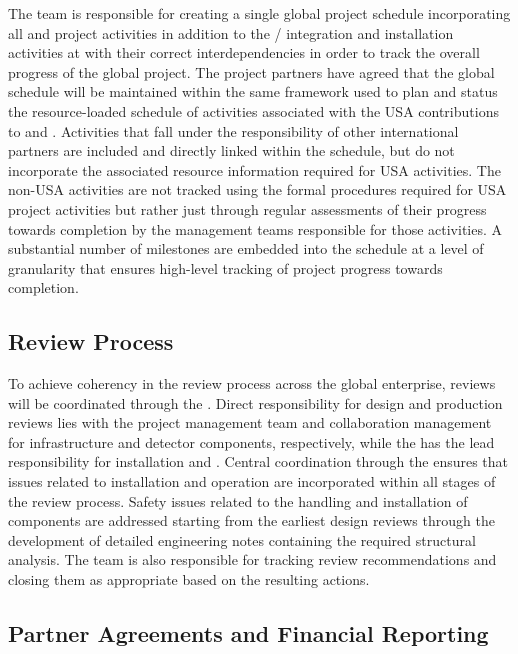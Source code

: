 The  team is responsible for creating a single global
project schedule incorporating all  and 
project activities in addition to the /
integration and installation activities at  with their correct
interdependencies in order to track the overall progress of the global
project.  The project partners have agreed that the global schedule
will be maintained within the same  framework used to plan and
status the resource-loaded schedule of activities associated with the
USA contributions to  and .  Activities that
fall under the responsibility of other international partners are
included and directly linked within the  schedule, but do not
incorporate the associated resource information required for
USA activities.  The non-USA activities are not tracked using the
formal  procedures required for USA project activities but rather
just through regular assessments of their progress towards completion
by the management teams responsible for those activities.  A
substantial number of milestones are embedded into the schedule at a
level of granularity that ensures high-level tracking of project
progress towards completion.

\subsection{Review Process}
\label{sec:dune_review}

To achieve coherency in the review process across the global
enterprise, reviews will be coordinated through the .
Direct responsibility for design and production reviews lies with the
 project management team and  collaboration
management for infrastructure and detector components, respectively,
while the  has the lead responsibility for installation and
.  Central coordination through the
 ensures that issues related to installation and operation
are incorporated within all stages of the review process.  Safety
issues related to the handling and installation of components are
addressed starting from the earliest design reviews through the
development of detailed engineering notes containing the required
structural analysis.  The  team is also responsible for
tracking review recommendations and closing them as appropriate based
on the resulting actions.

\subsection{Partner Agreements and Financial Reporting}
\label{sec:dune_agreements}

